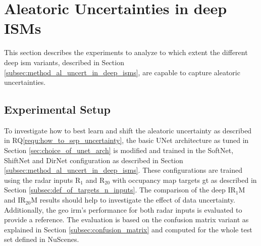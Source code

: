 \section{Aleatoric Uncertainties in deep ISMs}
\label{sec:al_uncert_in_deep_isms}
This section describes the experiments to analyze to which extent the different deep \gls{ism} variants, described in Section \ref{subsec:method_al_uncert_in_deep_isms}, are capable to capture aleatoric uncertainties.
%
\subsection{Experimental Setup}
\label{subsec:exp_setup_aleat_uncert}
To investigate how to best learn and shift the aleatoric uncertainty as described in RQ\ref{requ:how_to_sep_uncertainty}, the basic UNet architecture as tuned in Section \ref{sec:choice_of_unet_arch} is modified and trained in the SoftNet, ShiftNet and DirNet configuration as described in Section \ref{subsec:method_al_uncert_in_deep_isms}. These configurations are trained using the radar inputs R$_1$ and R$_{20}$ with occupancy map targets \gls{gt} as described in Section \ref{subsec:def_of_targets_n_inputs}. The comparison of the deep IR$_1$M and IR$_{20}$M results should help to investigate the effect of data uncertainty. Additionally, the geo \gls{irm}'s performance for both radar inputs is evaluated to provide a reference. The evaluation is based on the confusion matrix variant as explained in Section \ref{subsec:confusion_matrix} and computed for the whole test set defined in NuScenes.
%
